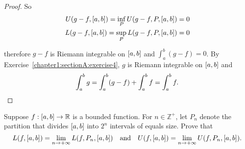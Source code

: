 \begin{proof}
    So
    \[
        \begin{split}
            U(g - f, \left[{a, b}\right]) = \inf\limits_{P}U(g - f, P, \left[{a, b}\right]) = 0 \\
            L(g - f, \left[{a, b}\right]) = \sup\limits_{P}L(g - f, P, \left[{a, b}\right]) = 0
        \end{split}
    \]

    therefore $g - f$ is Riemann integrable on $\left[{a, b}\right]$ and $\int^{b}_{a}(g - f) = 0$. By Exercise~\ref{chapter1:sectionA:exercise4}, $g$ is Riemann integrable on $\left[{a, b}\right]$ and
    \[
        \int^{b}_{a}g = \int^{b}_{a}(g - f) + \int^{b}_{a}f = \int^{b}_{a}f.\qedhere
    \]
\end{proof}
\newpage

\begin{exercise}\label{chapter1:sectionA:exercise7}
    Suppose $f: \left[{a,b}\right]\to\mathbb{R}$ is a bounded function. For $n\in\mathbb{Z}^{+}$, let $P_{n}$ denote the partition that divides $\left[{a, b}\right]$ into $2^{n}$ intervals of equals size. Prove that
    \[
        L(f, \left[{a, b}\right]) = \lim\limits_{n\to+\infty} L(f, P_{n}, \left[{a, b}\right])\quad\text{and}\quad U(f, \left[{a, b}\right]) = \lim\limits_{n\to+\infty} U(f, P_{n}, \left[{a, b}\right]).
    \]
\end{exercise}

